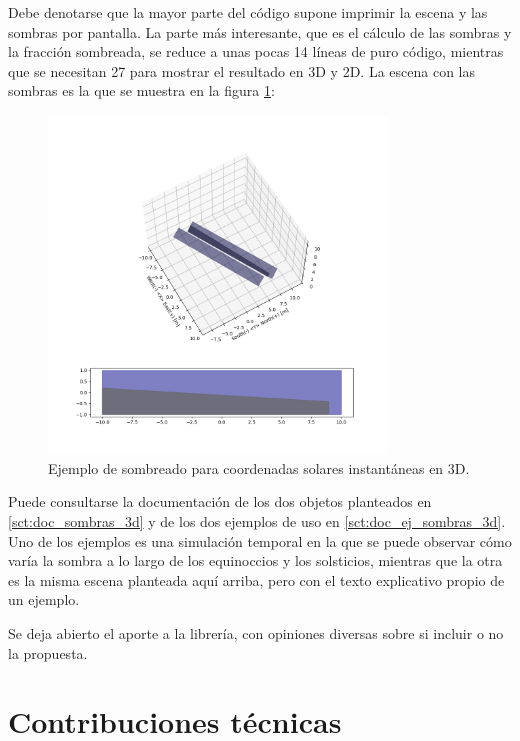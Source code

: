 Debe denotarse que la mayor parte del código supone imprimir la escena y las sombras por pantalla. La parte más interesante, que es el cálculo de las sombras y la fracción sombreada, se reduce a unas pocas 14 líneas de puro código, mientras que se necesitan 27 para mostrar el resultado en 3D y 2D. La escena con las sombras es la que se muestra en la figura \ref{fig:sombreado_3d}:

\begin{figure}[H]
    \centering
    \includegraphics[width=0.8\textwidth]{./images/shading_3d/sphx_glr_plot_spatial_row_to_row_shading_001.png}
    \caption{Ejemplo de sombreado para coordenadas solares instantáneas en 3D.}
    \label{fig:sombreado_3d}
\end{figure}

Puede consultarse la documentación de los dos objetos planteados en \ref{sct:doc_sombras_3d} y de los dos ejemplos de uso en \ref{sct:doc_ej_sombras_3d}. Uno de los ejemplos es una simulación temporal en la que se puede observar cómo varía la \gls{sombra} a lo largo de los equinoccios y los solsticios, mientras que la otra es la misma escena planteada aquí arriba, pero con el texto explicativo propio de un ejemplo.

Se deja abierto el aporte a la librería, con opiniones diversas sobre si incluir o no la propuesta.

\section{Contribuciones técnicas} \label{sct:desarrollo:contribuciones_tecnicas}

